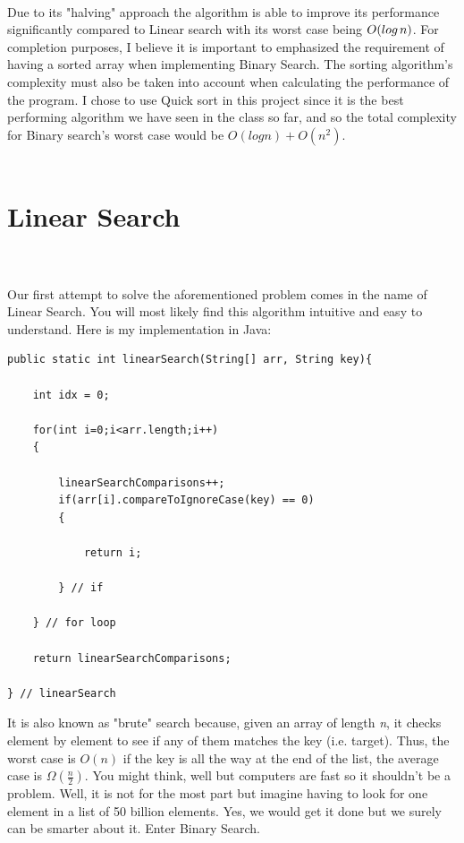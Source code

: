 \documentclass[letterpaper, 10pt]{article}
\begin{document}
\\
Due to its "halving" approach the algorithm is able to improve its performance significantly compared to Linear search with its worst case being $O(log\hspace{0.5mm} n)$. For completion purposes, I believe it is important to emphasized the requirement of having a sorted array when implementing Binary Search. The sorting algorithm's complexity must also be taken into account when calculating the performance of the program. I chose to use Quick sort in this project since it is the best performing algorithm we have seen in the class so far, and so the total complexity for Binary search's worst case would be $O(log n) + O(n^2)$. 
\\
\\
\section{Linear Search}
\\
\\
Our first attempt to solve the aforementioned problem comes in the name of Linear Search. You will most likely find this algorithm  intuitive and easy to understand. Here is my implementation in Java:
\begin{lstlisting}
public static int linearSearch(String[] arr, String key){ 
	
	int idx = 0;
	
	for(int i=0;i<arr.length;i++)
	{
		
		linearSearchComparisons++;
        if(arr[i].compareToIgnoreCase(key) == 0)
        {    
        	
            return i;    
            
        } // if  
        
    } // for loop
	
    return linearSearchComparisons;
    
} // linearSearch
\end{lstlisting}
It is also known as "brute" search because, given an array of length \textit{n}, it checks element by element to see if any of them matches the key (i.e. target). Thus, the worst case is $O(n)$ if the key is all the way at the end of the list, the average case is $\Omega (\frac{n}{2})$. You might think, well but computers are fast so it shouldn't be a problem. Well, it is not for the most part but imagine having to look for one element in a list of 50 billion elements. Yes, we would get it done but we surely can be smarter about it. Enter Binary Search.
\\
\\
\end{document}
